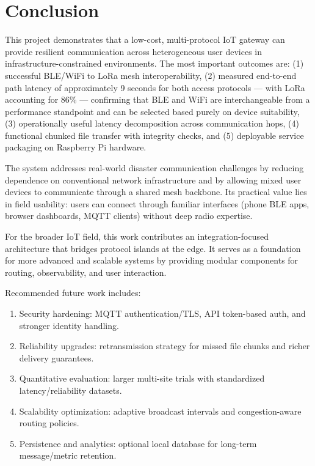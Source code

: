 \documentclass[conference]{IEEEtran}
\begin{document}
\section{Conclusion}
This project demonstrates that a low-cost, multi-protocol IoT gateway can provide resilient communication across heterogeneous user devices in infrastructure-constrained environments. The most important outcomes are: (1) successful BLE/WiFi to LoRa mesh interoperability, (2) measured end-to-end path latency of approximately 9 seconds for both access protocols — with LoRa accounting for 86\% — confirming that BLE and WiFi are interchangeable from a performance standpoint and can be selected based purely on device suitability, (3) operationally useful latency decomposition across communication hops, (4) functional chunked file transfer with integrity checks, and (5) deployable service packaging on Raspberry Pi hardware.

The system addresses real-world disaster communication challenges by reducing dependence on conventional network infrastructure and by allowing mixed user devices to communicate through a shared mesh backbone. Its practical value lies in field usability: users can connect through familiar interfaces (phone BLE apps, browser dashboards, MQTT clients) without deep radio expertise.

For the broader IoT field, this work contributes an integration-focused architecture that bridges protocol islands at the edge. It serves as a foundation for more advanced and scalable systems by providing modular components for routing, observability, and user interaction.

Recommended future work includes:
\begin{enumerate}
\item Security hardening: MQTT authentication/TLS, API token-based auth, and stronger identity handling.
\item Reliability upgrades: retransmission strategy for missed file chunks and richer delivery guarantees.
\item Quantitative evaluation: larger multi-site trials with standardized latency/reliability datasets.
\item Scalability optimization: adaptive broadcast intervals and congestion-aware routing policies.
\item Persistence and analytics: optional local database for long-term message/metric retention.
\end{enumerate}
\end{document}
